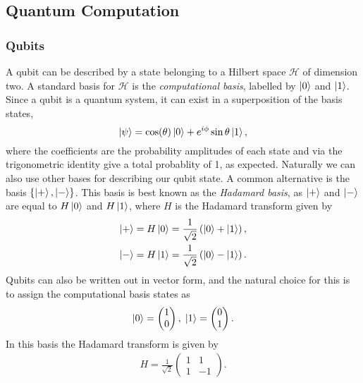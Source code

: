 \subsection{Quantum Computation}
\subsubsection{Qubits}
\label{subsubsection:qubits}
A qubit can be described by a state belonging to a Hilbert space $\mathcal{H}$ of dimension two.
A standard basis for $\mathcal{H}$ is the \emph{computational basis}, labelled by $\ket{0}$ and $\ket{1}$.
Since a qubit is a quantum system, it can exist in a superposition of the basis states,
\begin{equation}
    \label{eqn:arb_qubit}
    \ket{\psi} = \cos(\theta)\ket{0} + e^{i\phi}\sin{\theta}\ket{1},
\end{equation}
where the coefficients are the probability amplitudes of each state and via the trigonometric identity give a total probablity of 1, as expected.
Naturally we can also use other bases for describing our qubit state. A common alternative is the basis $\{\ket{+}, \ket{-}\}$.
This basis is best known as the \emph{Hadamard basis}, as $\ket{+}$ and $\ket{-}$ are equal to $H\ket{0}$ and $H\ket{1}$, where $H$ is the Hadamard transform given by
\begin{align}
    \ket{+} &= H\ket{0} = \frac{1}{\sqrt2} \left(\ket{0} + \ket{1}\right),\\
    \ket{-} &= H\ket{1} = \frac{1}{\sqrt2} \left(\ket{0} - \ket{1}\right).
\end{align}
Qubits can also be written out in vector form, and the natural choice for this is to assign the computational basis states as
\begin{align}
    \ket{0} = 
    \begin{pmatrix}
        1 \\
        0
    \end{pmatrix}, \;
    \ket{1} = 
    \begin{pmatrix}
        0 \\
        1
    \end{pmatrix}.
\end{align}
In this basis the Hadamard transform is given by
\begin{align}
    H = \frac{1}{\sqrt{2}}
    \begin{pmatrix}
        1 & 1\\
        1 & -1
    \end{pmatrix}.
    \label{eqn:hadmard_matrix}
\end{align}

